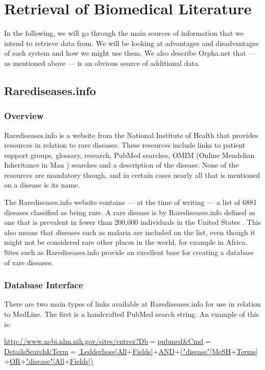\section{Retrieval of Biomedical Literature}

In the following, we will go through the main sources of information
that we intend to retrieve data from. We will be looking at advantages
and disadvantages of each system and how we might use them. We also
describe Orpha.net that --- as mentioned above --- is an obvious source of
additional data.

\subsection{Rarediseases.info\label{Rarediseases_info}}

\subsubsection{Overview}
Rarediseases.info is a website from the National Institute of Health
\cite{NIHOverview} that provides resources in relation to rare
diseases. These resources include links to patient support groups,
glossary, research, PubMed searches, OMIM (Online Mendelian
Inheritance in Man \cite{OMIM}) searches and a description of the
disease. None of the resources are mandatory though, and in certain
cases nearly all that is mentioned on a disease is its name.

The Rarediseases.info website contains --- at the time of writing --- a list
of 6881 diseases classified as being rare. A rare disease is by
Rarediseases.info defined as one that is prevalent in fewer than
200,000 individuals in the United States \cite{RareDiseaseDef}. This
also means that diseases such as malaria are included on the list,
even though it might not be considered rare other places in the world,
for example in Africa. Sites such as Rarediseases.info provide an excellent
base for creating a database of rare diseases.

\subsubsection{Database Interface}
There are two main types of links available at Rarediseases.info for
use in relation to MedLine. The first is a handcrafted PubMed search
string. An example of this is:

\noindent
{\small
\href{http://www.ncbi.nlm.nih.gov/sites/entrez?Db=pubmed&Cmd=DetailsSearch&Term=Ledderhose[All+Fields]+AND+("disease"[MeSH+Terms]+OR+"disease"[All+Fields])}{http://www.ncbi.nlm.nih.gov/sites/entrez?Db$=$pubmed\&Cmd$=$DetailsSearch\&Term$=$ Ledderhose[All$+$Fields]$+$AND$+$("disease"[MeSH$+$Terms]$+$OR$+$"disease"[All$+$Fields])} \\
}

